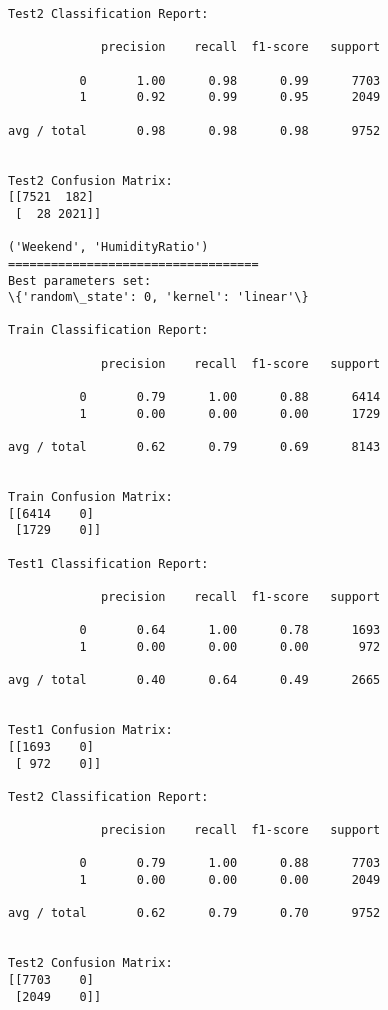 \documentclass[11pt]{article}
\begin{document}
\begin{Verbatim}[commandchars=\\\{\}]
Test2 Classification Report:

             precision    recall  f1-score   support

          0       1.00      0.98      0.99      7703
          1       0.92      0.99      0.95      2049

avg / total       0.98      0.98      0.98      9752


Test2 Confusion Matrix:
[[7521  182]
 [  28 2021]]

('Weekend', 'HumidityRatio')
===================================
Best parameters set:
\{'random\_state': 0, 'kernel': 'linear'\}

Train Classification Report:

             precision    recall  f1-score   support

          0       0.79      1.00      0.88      6414
          1       0.00      0.00      0.00      1729

avg / total       0.62      0.79      0.69      8143


Train Confusion Matrix:
[[6414    0]
 [1729    0]]

Test1 Classification Report:

             precision    recall  f1-score   support

          0       0.64      1.00      0.78      1693
          1       0.00      0.00      0.00       972

avg / total       0.40      0.64      0.49      2665


Test1 Confusion Matrix:
[[1693    0]
 [ 972    0]]

Test2 Classification Report:

             precision    recall  f1-score   support

          0       0.79      1.00      0.88      7703
          1       0.00      0.00      0.00      2049

avg / total       0.62      0.79      0.70      9752


Test2 Confusion Matrix:
[[7703    0]
 [2049    0]]


    \end{Verbatim}
\end{document}
